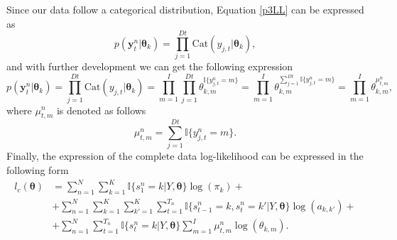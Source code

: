 \documentclass[12pt]{article}
\newcommand{\indicator}{\mathbb{I}}
\begin{document}
\noindent Since our data follow a categorical distribution, Equation \ref{p3LL} can be expressed as
\begin{equation}
p \left( \mathbf { y } _ { t } ^ { n } | \boldsymbol\theta_{k} \right) = \prod\limits_{j=1}^{Dt} \text{Cat}(y_{j,t}|\boldsymbol\theta_{k}),
\end{equation}
and with further development we can get the following expression
\begin{equation}
p \left( \mathbf { y } _ { t } ^ { n } | \boldsymbol\theta_{k} \right) = \prod\limits_{j=1}^{Dt} \text{Cat}(y_{j,t}|\boldsymbol\theta_{k}) = \prod\limits_{m=1}^{I}\prod\limits_{j=1}^{Dt}\theta_{k,m}^{\indicator\lbrace{y_{j,t}^{n}=m}\rbrace} = \prod\limits_{m=1}^{I}\theta_{k,m}^{\sum\limits_{j=1}^{Dt}\indicator\lbrace{y_{j,t}^{n}=m}\rbrace} = \prod\limits_{m=1}^{I}\theta_{k,m}^{\mu^{n}_{t,m}},
\end{equation}
where  $\mu^{n}_{t,m}$ is denoted as follows
\begin{equation}
\mu^{n}_{t,m} = \sum\limits_{j=1}^{Dt}\indicator\lbrace{y_{j,t}^{n}=m}\rbrace.
\end{equation}
Finally, the expression of the complete data log-likelihood can be expressed in the following form	
\begin{equation}
\begin{split}
l_{c}\left(\boldsymbol\theta\right) &= \sum\limits_{n=1}^{N}\sum\limits_{k=1}^{K}\indicator \lbrace s_{1}^{n}=k|Y,\boldsymbol\theta\rbrace \log(\pi_{k}) + \\
&+ \sum\limits_{n=1}^{N}\sum\limits_{k=1}^{K}\sum\limits_{k'=1}^{K}\sum\limits_{t=1}^{T_{n}}\indicator \lbrace s_{t-1}^{n}=k,s_{t}^{n}=k'|Y,\boldsymbol\theta\rbrace \log(a_{k,k'}) + \\
&+ \sum\limits_{n=1}^{N}\sum\limits_{t=1}^{T_{n}}\indicator \lbrace s_{t}^{n}=k|Y,\boldsymbol\theta\rbrace \sum\limits_{m=1}^{I}\mu^{n}_{t,m} \log(\theta_{k,m}).
\end{split}
\end{equation}
\end{document}
